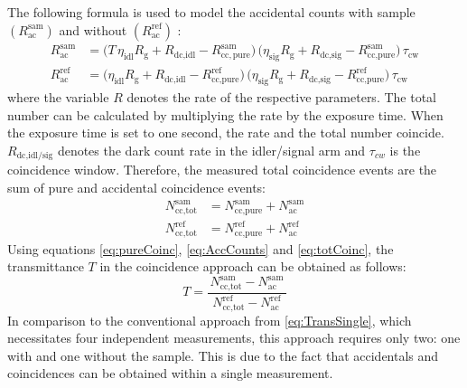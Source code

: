 The following formula is used to model the accidental counts with sample $\left(R_{\text{ac}}^{\text{sam}} \right)$ and without $\left(R_{\text{ac}}^{\text{ref}} \right)$ \cite{hayatTheoryPhotonCoincidence1999}:
\begin{equation}
	\begin{aligned}
		R_{\text{ac}}^{\text{sam}} 
		&= \Big( T\,\eta_{\text{idl}} R_{\mathrm{g}} + R_{\text{dc,idl}} - R_{\mathrm{cc,pure}}^{\mathrm{sam}} \Big) \,
		\Big( \eta_{\text{sig}} R_{\mathrm{g}} + R_{\text{dc,sig}} - R_{\text{cc,pure}}^{\text{sam}} \Big) \,
		\tau_{\text{cw}} \\[0.75em]
		R_{\text{ac}}^{\text{ref}} 
		&= \Big( \eta_{\text{idl}} R_{\mathrm{g}} + R_{\text{dc,idl}} - R_{\text{cc,pure}}^{\text{ref}} \Big) \,
		\Big( \eta_{\text{sig}} R_{\mathrm{g}} + R_{\text{dc,sig}} - R_{\text{cc,pure}}^{\text{ref}} \Big) \,
		\tau_{\text{cw}}
	\end{aligned}
	\label{eq:AccCounts}
\end{equation}
where the variable $R$ denotes the rate of the respective parameters. The total number can be calculated by multiplying the rate by the exposure time. When the exposure time is set to one second, the rate and the total number coincide. $R_{\text{dc,idl/sig}}$ denotes the dark count rate in the idler/signal arm and $\tau_{cw}$ is the coincidence window.\newline
Therefore, the measured total coincidence events are the sum of pure and accidental coincidence events:
\begin{equation}
	\begin{aligned}
		N_{\text{cc,tot}}^{\text{sam}} &= N_{\text{cc,pure}}^{\text{sam}} + N_{\text{ac}}^{\text{sam}} \\[0.5em]
		N_{\text{cc,tot}}^{\text{ref}} &= N_{\text{cc,pure}}^{\text{ref}} + N_{\text{ac}}^{\text{ref}}
	\end{aligned}
	\label{eq:totCoinc}
\end{equation}
Using equations \ref{eq:pureCoinc}, \ref{eq:AccCounts} and \ref{eq:totCoinc}, the transmittance $T$ in the coincidence approach can be obtained as follows:
\begin{equation}
	T = 
	\frac{\,N_{\text{cc,tot}}^{\text{sam}} - N_{\text{ac}}^{\text{sam}}\,}
	{\,N_{\text{cc,tot}}^{\text{ref}} - N_{\text{ac}}^{\text{ref}}\,}
	\label{eq:TransCoinc}
\end{equation}
In comparison to the conventional approach from \autoref{eq:TransSingle}, which necessitates four independent measurements, this approach requires only two: one with and one without the sample. This is due to the fact that  accidentals and coincidences can be obtained within a single measurement. \newline
